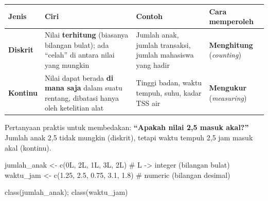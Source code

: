 \documentclass[
  indonesian,
  letterpaper,
]{book}
\newenvironment{Shaded}{\begin{snugshade}}{\end{snugshade}}
\newcommand{\CommentTok}[1]{\textcolor[rgb]{0.37,0.37,0.37}{#1}}
\newcommand{\DecValTok}[1]{\textcolor[rgb]{0.68,0.00,0.00}{#1}}
\newcommand{\FloatTok}[1]{\textcolor[rgb]{0.68,0.00,0.00}{#1}}
\newcommand{\FunctionTok}[1]{\textcolor[rgb]{0.28,0.35,0.67}{#1}}
\newcommand{\NormalTok}[1]{\textcolor[rgb]{0.00,0.23,0.31}{#1}}
\newcommand{\OtherTok}[1]{\textcolor[rgb]{0.00,0.23,0.31}{#1}}
\newcounter{none} %
\begin{document}
{\def\LTcaptype{none} %
\begin{longtable}[]{@{}
  >{\raggedright\arraybackslash}p{}
  >{\raggedright\arraybackslash}p{}
  >{\raggedright\arraybackslash}p{}
  >{\raggedright\arraybackslash}p{}@{}}
\toprule\noalign{}
\begin{minipage}[b]{\linewidth}\raggedright
Jenis
\end{minipage} & \begin{minipage}[b]{\linewidth}\raggedright
Ciri
\end{minipage} & \begin{minipage}[b]{\linewidth}\raggedright
Contoh
\end{minipage} & \begin{minipage}[b]{\linewidth}\raggedright
Cara memperoleh
\end{minipage} \\
\midrule\noalign{}
\endhead
\bottomrule\noalign{}
\endlastfoot
\textbf{Diskrit} & Nilai \textbf{terhitung} (biasanya bilangan bulat);
ada ``celah'' di antara nilai yang mungkin & Jumlah anak, jumlah
transaksi, jumlah mahasiswa yang hadir & \textbf{Menghitung}
(\emph{counting}) \\
\textbf{Kontinu} & Nilai dapat berada \textbf{di mana saja} dalam suatu
rentang, dibatasi hanya oleh ketelitian alat & Tinggi badan, waktu
tempuh, suhu, kadar TSS air & \textbf{Mengukur} (\emph{measuring}) \\
\end{longtable}
}

Pertanyaan praktis untuk membedakan: \textbf{``Apakah nilai 2,5 masuk
akal?''} Jumlah anak 2,5 tidak mungkin (diskrit), tetapi waktu tempuh
2,5 jam masuk akal (kontinu).

\begin{Shaded}
\begin{Highlighting}[]
\NormalTok{jumlah\_anak }\OtherTok{\textless{}{-}} \FunctionTok{c}\NormalTok{(}\DecValTok{0}\NormalTok{L, }\DecValTok{2}\NormalTok{L, }\DecValTok{1}\NormalTok{L, }\DecValTok{3}\NormalTok{L, }\DecValTok{2}\NormalTok{L) }\CommentTok{\# L {-}\textgreater{} integer (bilangan bulat)}
\NormalTok{waktu\_jam }\OtherTok{\textless{}{-}} \FunctionTok{c}\NormalTok{(}\FloatTok{1.25}\NormalTok{, }\FloatTok{2.5}\NormalTok{, }\FloatTok{0.75}\NormalTok{, }\FloatTok{3.1}\NormalTok{, }\FloatTok{1.8}\NormalTok{) }\CommentTok{\# numeric (bilangan desimal)}

\FunctionTok{class}\NormalTok{(jumlah\_anak); }\FunctionTok{class}\NormalTok{(waktu\_jam)}
\end{Highlighting}
\end{Shaded}
\end{document}
